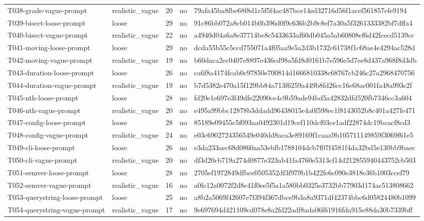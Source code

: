 \begin{tabular}{lllll}
T038-grade-vague-prompt & realistic\_vague & 20 & no & 79afa45ba8fbe68f8d1c5f5f4ac487bce14ed32716d56f1acef561857efe9194 \\
T039-bisect-loose-prompt & loose & 29 & no & 91c86bb072a8cb014b0b396d0f9c636b2b9c8ef7a30a5f3261333382bf7dffa4 \\
T040-bisect-vague-prompt & realistic\_vague & 22 & no & a4940d04a6a8e37714be8c5433633af60db045a5ab60808ef6d42fcecd5139cc \\
T041-moving-loose-prompt & loose & 29 & no & dcda55b55c5ccd755071a4f05aa9e5a2d3b1732c61738f1c68ae4e4294ac528d \\
T042-moving-vague-prompt & realistic\_vague & 19 & no & b60daca2ec0407e8897e436cd98a5fd8d0161b7e596e5d7ee8d437a968f8d3db \\
T043-duration-loose-prompt & loose & 26 & no & ca6f8a4174fcab0c97850e700814d1666810338c68767cb246c27a2968470756 \\
T044-duration-vague-prompt & realistic\_vague & 19 & no & b7d5382e470a15f129bb84a713f6259a449b8fd26cc16e68ac001fa48a993c2f \\
T045-nth-loose-prompt & loose & 28 & no & fd20e1e697e3f49dfe22090ce4c9b59ade94bd5a42832dfd520fb7346cc3a604 \\
T046-nth-vague-prompt & realistic\_vague & 20 & no & e495a99bbc12878b3ddadd96438015e4a0f598ec1f8143052b8c401a427fe471 \\
T047-config-loose-prompt & loose & 28 & no & 85189e09455c5f093aa0492301d19cef110dcf03ce1adf22874dc19bcacf8cd3 \\
T048-config-vague-prompt & realistic\_vague & 24 & no & e03c6902724356549e040dd8aca3e89169f1caaa9b105711149859f3069f61e5 \\
T049-cli-loose-prompt & loose & 26 & no & e3da233aec68d0860aa53ebfb1788104dcb7f07f4581f4da32bd5e130bb9baec \\
T050-cli-vague-prompt & realistic\_vague & 20 & no & df3d20cb719a274d0877e323ab41fa4760e5313cf14d212855940443752cb503 \\
T051-semver-loose-prompt & loose & 28 & no & 2705ef1972849dfbce0505352df3f979b1b422fe6c090e3818e36b1003ccef79 \\
T052-semver-vague-prompt & realistic\_vague & 16 & no & a0fe12a0072f2d8e41f0ee5f5a1a580bb0325e3732bb77903d174ac513808662 \\
T053-querystring-loose-prompt & loose & 25 & no & a8b2a5069f42607e7f394f367dbce9b3a8a9371df42374bbc6d05824480b1099 \\
T054-querystring-vague-prompt & realistic\_vague & 17 & no & 9e697694d421109cd078e8a2fd22adf8ada06f61916fda915e88da30b7339bff \\
\bottomrule
\end{tabular}
